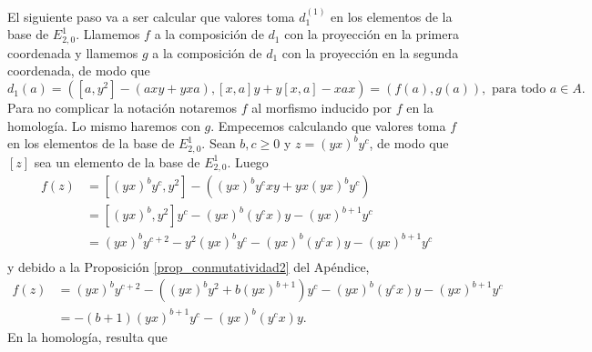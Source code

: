 \documentclass[fleqn,../tesis.tex]{subfiles}
\begin{document}
El siguiente paso va a ser calcular que valores toma $d_1^{(1)}$ en los elementos de la base de $E^1_{2, 0}$. Llamemos
$f$ a la composición de $d_1$ con la proyección en la primera coordenada y llamemos $g$ a la composición de $d_1$ con la proyección en la segunda coordenada, de modo que
\[
	d_1(a) =  \left(\left[a,y^2\right] - (axy + yxa), \left[x,a\right]y + y\left[x,a\right] - xax\right) = (f(a), g(a)), \text{ para todo } a \in A.
\]
Para no complicar la notación notaremos $f$ al morfismo inducido por $f$ en la homología. Lo mismo haremos con $g$.
Empecemos calculando que valores toma $f$ en los elementos de la base de $E^1_{2, 0}$. Sean $b, c \geq 0$ y $z = (yx)^by^c$, de modo que $\left[z\right]$
sea un elemento de la base de $E^1_{2, 0}$. Luego
\begin{align*}
	f(z) &= \left[(yx)^by^c, y^2\right] - \left((yx)^by^cxy + yx(yx)^by^c\right)\\
	&= \left[(yx)^b, y^2\right]y^c - (yx)^b(y^cx)y - (yx)^{b + 1}y^c \\
	&= (yx)^by^{c + 2} - y^2(yx)^by^c - (yx)^b(y^cx)y - (yx)^{b + 1}y^c \\
\end{align*}
y debido a la Proposición \ref{prop_conmutatividad2} del Apéndice,
\begin{align*}
	f(z) &= (yx)^by^{c + 2} - ((yx)^by^2 + b(yx)^{b + 1})y^c - (yx)^b(y^cx)y - (yx)^{b + 1}y^c \\
	&= - (b + 1)(yx)^{b + 1}y^c - (yx)^b(y^cx)y.
\end{align*}
En la homología, resulta que
\end{document}
